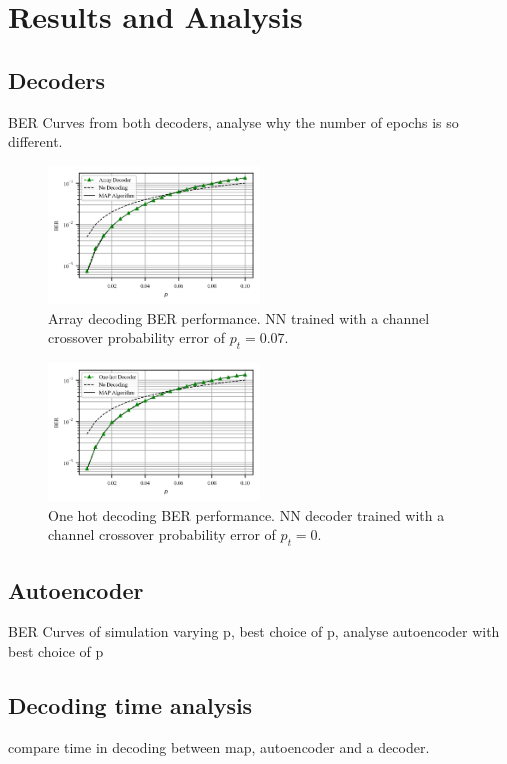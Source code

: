 \documentclass[conference]{IEEEtran}
\begin{document}
\section{Results and Analysis}

\subsection{Decoders}
BER Curves from both decoders, analyse why the number of epochs is so different. 

\begin{figure}[!ht]
  \centering
    \includegraphics[width=0.5\textwidth]{images/MLNN_Mep_65536_ptrain_007}
    \caption{Array decoding BER performance. NN trained with a channel crossover probability error of $p_t=0.07$.}\label{fig:ArrayD}
\end{figure}

\begin{figure}[!ht]
  \centering
    \includegraphics[width=0.5\textwidth]{images/MLNN1H_Mep_16384_ptrain_0}
    \caption{One hot decoding BER performance. NN decoder trained with a channel crossover probability error of $p_t=0$.}\label{fig:1HD}
\end{figure}


\subsection{Autoencoder}
BER Curves of simulation varying p, best choice of p, analyse autoencoder with best choice of p


\subsection{Decoding time analysis}
compare time in decoding between map, autoencoder and a decoder.
\end{document}
